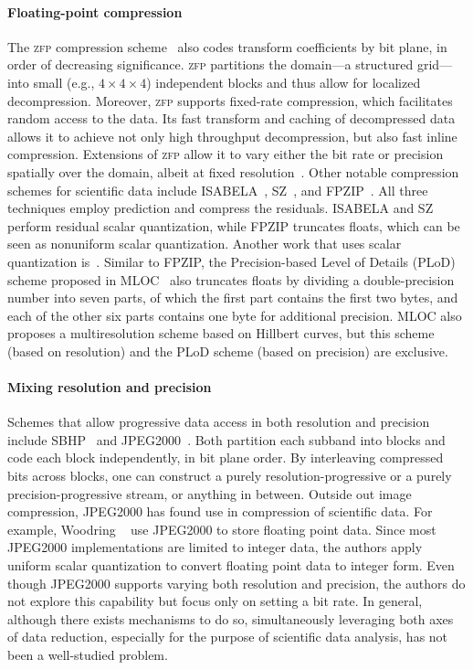 \paragraph{\textbf{Floating-point compression}}
\newcommand{\zfp}{\textsc{zfp}\xspace}
The \zfp compression scheme~\cite{zfp2014} also codes transform coefficients by bit plane, in order
of decreasing significance. \zfp partitions the domain---a structured grid---into small (e.g., $4
\times 4 \times 4$) independent blocks and thus allow for localized decompression. Moreover, \zfp
supports fixed-rate compression, which facilitates random access to the data. Its fast transform and
caching of decompressed data allows it to achieve not only high throughput decompression, but also
fast inline compression. Extensions of \zfp allow it to vary either the bit rate or precision
spatially over the domain, albeit at fixed resolution~\cite{zfp-arc}. Other notable compression
schemes for scientific data include ISABELA~\cite{isabela}, SZ~\cite{sz}, and FPZIP~\cite{fpzip}.
All three techniques employ prediction and compress the residuals. ISABELA and SZ perform residual
scalar quantization, while FPZIP truncates floats, which can be seen as nonuniform scalar
quantization. Another work that uses scalar quantization is~\cite{sqe}. Similar to FPZIP, the
Precision-based Level of Details (PLoD) scheme proposed in MLOC~\cite{mloc} also truncates floats by
dividing a double-precision number into seven parts, of which the first part contains the first two
bytes, and each of the other six parts contains one byte for additional precision. MLOC also
proposes a multiresolution scheme based on Hillbert curves, but this scheme (based on resolution)
and the PLoD scheme (based on precision) are exclusive.

\paragraph{\textbf{Mixing resolution and precision}}
Schemes that allow progressive data access in both resolution and precision include
SBHP~\cite{sbhp2000} and JPEG2000~\cite{jpeg2000}. Both partition each subband into blocks and code
each block independently, in bit plane order. By interleaving compressed bits across blocks, one can
construct a purely resolution-progressive or a purely precision-progressive stream, or anything in
between. Outside out image compression, JPEG2000 has found use in compression of scientific data.
For example, Woodring \etal~\cite{woodring2011} use JPEG2000 to store floating point data. Since
most JPEG2000 implementations are limited to integer data, the authors apply uniform scalar
quantization to convert floating point data to integer form. Even though JPEG2000 supports varying
both resolution and precision, the authors do not explore this capability but focus only on setting
a bit rate. In general, although there exists mechanisms to do so, simultaneously leveraging both
axes of data reduction, especially for the purpose of scientific data analysis, has not been a
well-studied problem.

